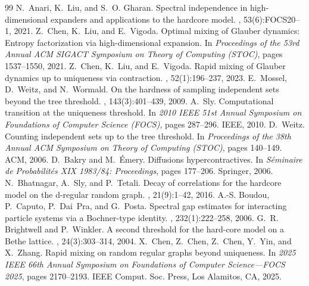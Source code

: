 \documentclass[10pt,a4paper]{amsart}
\begin{document}
\begin{thebibliography}{99}
 N.~Anari, K.~Liu, and S.~O. Gharan. \newblock Spectral independence in high-dimensional expanders and applications to the hardcore model. , 53(6):FOCS20--1, 2021.
 Z.~Chen, K.~Liu, and E.~Vigoda. \newblock Optimal mixing of {G}lauber dynamics: Entropy factorization via high-dimensional expansion. \newblock In {\em Proceedings of the 53rd Annual {ACM} {SIGACT} Symposium on Theory of Computing ({STOC})}, pages 1537--1550, 2021.
 Z.~Chen, K.~Liu, and E.~Vigoda. \newblock Rapid mixing of {G}lauber dynamics up to uniqueness via contraction. , 52(1):196--237, 2023.
 E.~Mossel, D.~Weitz, and N.~Wormald. \newblock On the hardness of sampling independent sets beyond the tree threshold. , 143(3):401--439, 2009.
 A.~Sly. \newblock Computational transition at the uniqueness threshold. \newblock In {\em 2010 IEEE 51st Annual Symposium on Foundations of Computer Science ({FOCS})}, pages 287--296. IEEE, 2010.
 D.~Weitz. \newblock Counting independent sets up to the tree threshold. \newblock In {\em Proceedings of the 38th Annual {ACM} Symposium on Theory of Computing ({STOC})}, pages 140--149. ACM, 2006.
 D.~Bakry and M.~{\'E}mery. \newblock Diffusions hypercontractives. \newblock In {\em S{\'e}minaire de Probabilit{\'e}s XIX 1983/84: Proceedings}, pages 177--206. Springer, 2006.
 N.~Bhatnagar, A.~Sly, and P.~Tetali. \newblock Decay of correlations for the hardcore model on the d-regular random graph. , 21(9):1--42, 2016.
 A.-S. Boudou, P.~Caputo, P.~Dai~Pra, and G.~Posta. \newblock Spectral gap estimates for interacting particle systems via a {B}ochner-type identity. , 232(1):222--258, 2006.
 G.~R. Brightwell and P.~Winkler. \newblock A second threshold for the hard-core model on a {B}ethe lattice. , 24(3):303--314, 2004.
 X.~Chen, Z.~Chen, Z.~Chen, Y.~Yin, and X.~Zhang. \newblock Rapid mixing on random regular graphs beyond uniqueness. \newblock In {\em 2025 {IEEE} 66th {A}nnual {S}ymposium on {F}oundations of {C}omputer {S}cience---{FOCS} 2025}, pages 2170--2193. IEEE Comput. Soc. Press, Los Alamitos, CA, 2025.

\end{thebibliography}
\end{document}
